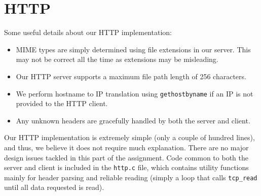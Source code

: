 \documentclass{article}
\begin{document}
\section{HTTP}
Some useful details about our HTTP implementation:

\begin{itemize}
\item MIME types are simply determined using file extensions in our server. This may not be correct all the time as extensions may be misleading.
\item Our HTTP server supports a maximum file path length of 256 characters.
\item We perform hostname to IP translation using \texttt{gethostbyname} if an IP is not provided to the HTTP client.
\item Any unknown headers are gracefully handled by both the server and client.
\end{itemize}

Our HTTP implementation is extremely simple (only a couple of hundred lines), and thus, we believe it does not require much explanation. There are no major design issues tackled in this part of the assignment. Code common to both the server and client is included in the \texttt{http.c} file, which contains utility functions mainly for header parsing and reliable reading (simply a loop that calls \texttt{tcp\_read} until all data requested is read).
\end{document}
